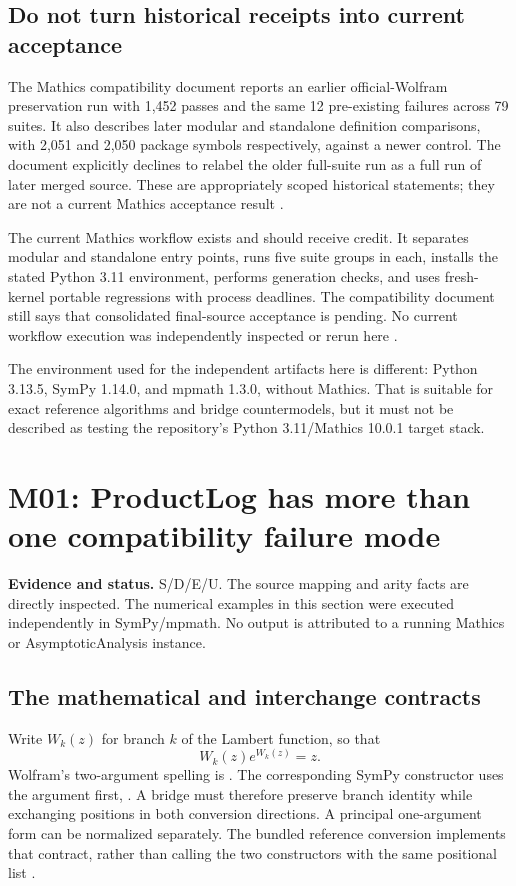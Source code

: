 \documentclass[11pt,a4paper]{article}
\newcommand{\code}[1]{\texttt{\detokenize{#1}}}
\newcommand{\evidence}[1]{\par\noindent\textbf{Evidence and status.} #1\par}
\theoremstyle{remark}
\begin{document}
\subsection{Do not turn historical receipts into current acceptance}

The Mathics compatibility document reports an earlier official-Wolfram preservation run with 1,452 passes and the same 12 pre-existing failures across 79 suites. It also describes later modular and standalone definition comparisons, with 2,051 and 2,050 package symbols respectively, against a newer control. The document explicitly declines to relabel the older full-suite run as a full run of later merged source. These are appropriately scoped historical statements; they are not a current Mathics acceptance result \cite{compatibility}.

The current Mathics workflow exists and should receive credit. It separates modular and standalone entry points, runs five suite groups in each, installs the stated Python 3.11 environment, performs generation checks, and uses fresh-kernel portable regressions with process deadlines. The compatibility document still says that consolidated final-source acceptance is pending. No current workflow execution was independently inspected or rerun here \cite{mathicsci,compatibility}.

The environment used for the independent artifacts here is different: Python 3.13.5, SymPy 1.14.0, and mpmath 1.3.0, without Mathics. That is suitable for exact reference algorithms and bridge countermodels, but it must not be described as testing the repository's Python 3.11/Mathics 10.0.1 target stack.

\section{M01: ProductLog has more than one compatibility failure mode}\label{sec:m01}
\evidence{S/D/E/U. The source mapping and arity facts are directly inspected. The numerical examples in this section were executed independently in SymPy/mpmath. No output is attributed to a running Mathics or AsymptoticAnalysis instance.}

\subsection{The mathematical and interchange contracts}

Write $W_k(z)$ for branch $k$ of the Lambert function, so that
\begin{equation}\label{eq:lambertidentity}
 W_k(z)e^{W_k(z)}=z.
\end{equation}
Wolfram's two-argument spelling is \code{ProductLog[k,z]}. The corresponding SymPy constructor uses the argument first, \code{LambertW(z,k)}. A bridge must therefore preserve branch identity while exchanging positions in both conversion directions. A principal one-argument form can be normalized separately. The bundled reference conversion implements that contract, rather than calling the two constructors with the same positional list \cite{upstreamexp,upstreambuiltin}.
\end{document}
